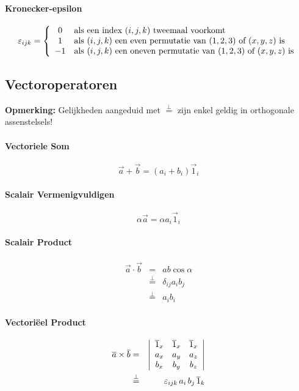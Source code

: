\paragraph{Kronecker-epsilon}
\label{sec:KroneckerEpsilon}
\[
  \varepsilon_{ijk} =
  \left\{
    \begin{array}[h]{cl}
      0 & \mbox{als een index ($i,j,k$) tweemaal voorkomt}\\
	    1 & \mbox{als ($i,j,k$) een even permutatie van ($1,2,3$) of ($x,y,z$) is} \\
	    -1 & \mbox{als ($i,j,k$) een oneven permutatie van ($1,2,3$) of ($x,y,z$) is}
    \end{array}
  \right.
\]

\subsection{Vectoroperatoren}
\label{sec:Vectoroperatoren}
  \textbf{Opmerking:} Gelijkheden aangeduid met $\stackrel{\bot}{=}$ zijn enkel geldig in orthogonale assenstelsels!
  \paragraph{Vectoriele Som}
  \label{sec:Optellen}
  \[
    \vec{a} + \vec{b} = \left( a_i + b_i \right) \vec{1}_i
  \]
  
  \paragraph{Scalair Vermenigvuldigen}
  \label{sec:Vermenigvuldigen}
  \[
    \alpha \vec{a} = \alpha a_i \vec{1}_i
  \]
  
  \paragraph{Scalair Product}
  \label{sec:ScalProduct}
  \begin{eqnarray*}
    \vec{a} \cdot \vec{b} & = & ab \cos{\alpha} \\
                          & \stackrel{\bot}{=} & \delta_{ij} a_i b_j\\
                          & \stackrel{\bot}{=} & a_i b_i  
  \end{eqnarray*}
  
  \paragraph{Vectoriëel Product}
  \label{sec:VectProduct}
  \begin{eqnarray*}
    \vec{a} \times \vec{b} & = &
    \left|
      \begin{array}[h]{ccc}
	       \vec{1}_x & \vec{1}_x & \vec{1}_x \\
	       a_x & a_y & a_z\\
	       b_x & b_y & b_z
      \end{array}
    \right| \\
      & \stackrel{\bot}{=} & \varepsilon_{ijk}\,  a_i \, b_j \, \vec{1}_k
  \end{eqnarray*}
  
